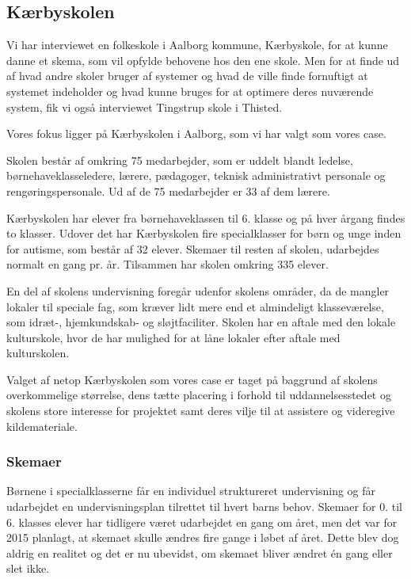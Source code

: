 \subsection{Kærbyskolen}
\label{Kaerbyskolen}
Vi har interviewet en folkeskole i Aalborg kommune, Kærbyskole, for at kunne danne et skema, som vil opfylde behovene hos den ene skole. Men for at finde ud af hvad andre skoler bruger af systemer og hvad de ville finde fornuftigt at systemet indeholder og hvad kunne bruges for at optimere deres nuværende system, fik vi også interviewet Tingstrup skole i Thisted.

Vores fokus ligger på Kærbyskolen i Aalborg, som vi har valgt som vores case.

Skolen består af omkring 75 medarbejder, som er uddelt blandt ledelse, børnehaveklasseledere, lærere, pædagoger, teknisk administrativt personale og rengøringspersonale. Ud af de 75 medarbejder er 33 af dem lærere.

Kærbyskolen har elever fra børnehaveklassen til 6. klasse og på hver årgang findes to klasser. Udover det har Kærbyskolen fire specialklasser for børn og unge inden for autisme, som består af 32 elever. Skemaer til resten af skolen, udarbejdes normalt en gang pr. år. Tilsammen har skolen omkring 335 elever.

En del af skolens undervisning foregår udenfor skolens områder, da de mangler lokaler til speciale fag, som kræver lidt mere end et almindeligt klasseværelse, som idræt-, hjemkundskab- og sløjtfaciliter. Skolen har en aftale med den lokale kulturskole, hvor de har mulighed for at låne lokaler efter aftale med kulturskolen.

Valget af netop Kærbyskolen som vores case er taget på baggrund af skolens overkommelige størrelse, dens tætte placering i forhold til uddannelsesstedet og skolens store interesse for projektet samt deres vilje til at assistere og videregive kildemateriale.

\subsubsection{Skemaer}
\label{Skemaer}
Børnene i specialklasserne får en individuel struktureret undervisning og får udarbejdet en undervisningsplan tilrettet til hvert barns behov\cite{j_klasser}.
Skemaer for 0. til 6. klasses elever har tidligere været udarbejdet en gang om året, men det var for 2015 planlagt, at skemaet skulle ændres fire gange i løbet af året. Dette blev dog aldrig en realitet og det er nu ubevidst, om skemaet bliver ændret én gang eller slet ikke.

